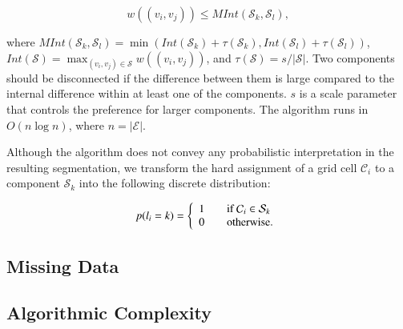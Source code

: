 \begin{equation}
\label{eqn:merge}
w((v_i,v_j))\leq MInt(\mathcal{S}_k, \mathcal{S}_l),
\end{equation}


where $MInt(\mathcal{S}_k,\mathcal{S}_l)=\min(Int(\mathcal{S}_k)+
\tau(\mathcal{S}_k),Int(\mathcal{S}_l)+\tau(\mathcal{S}_l))$,
$Int(\mathcal{S})=\max_{(v_i,v_j)\in\mathcal{S}} w((v_i,v_j))$, and
$\tau(\mathcal{S})=s/|\mathcal{S}|$. Two components should be disconnected if
the difference between them is large compared to the internal difference within
at least one of the components. $s$ is a scale parameter that controls the
preference for larger components. The algorithm runs in $O(n\log n)$, where
$n=|\mathcal{E}|$.

Although the algorithm does not convey any probabilistic interpretation in the
resulting segmentation, we transform the hard assignment of a grid cell
$\mathcal{C}_i$ to a component $\mathcal{S}_k$ into the following discrete
distribution:

\begin{equation}
\label{eqn:label_dist}
p(l_i=k) = \left\{
\begin{array}{l l}
1 & \quad \text{if $\mathcal{C}_i\in\mathcal{S}_k$}\\
0 & \quad \text{otherwise}.
\end{array} \right.
\end{equation}

\subsection{Missing Data}

\subsection{Algorithmic Complexity}


